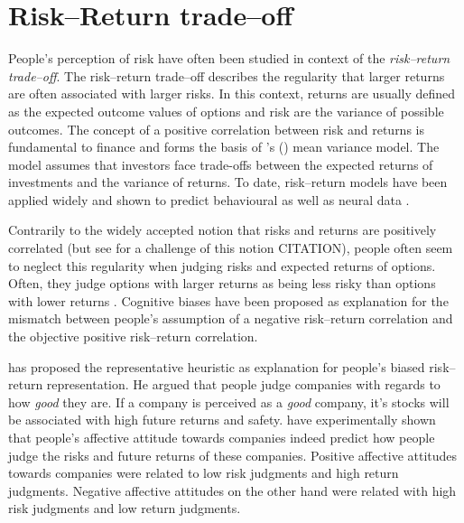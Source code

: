 \documentclass[a4paper,man, natbib,floatsintext]{apa6} %
\begin{document}
\section{Risk--Return trade--off}
People's perception of risk have often been studied in context of the 
\textit{risk--return trade--off}. The risk--return trade--off describes the regularity that larger returns are often associated with larger risks. In this context, returns are usually defined as the expected outcome values of options and risk are the variance of possible outcomes. The concept of a positive correlation between risk and returns is fundamental to finance and forms the basis of \citeauthor{Markowitz1952}'s (\citeyear{Markowitz1952}) mean variance model. The model assumes that investors face trade-offs between the expected returns of investments and the variance of returns. To date, risk--return models have been applied widely \citep[e.g.,][]{Weber2008, Mohr2010a} and shown to predict behavioural as well as neural data \citep{Mohr2010a}. %

Contrarily to the widely accepted notion that risks and returns are positively correlated (but see for a challenge of this notion CITATION), people often seem to neglect this regularity when judging risks and expected returns of options. Often, they judge options with larger returns as being less risky than options with lower returns \citep[e.g.,][]{Kempf2014}. Cognitive biases have been proposed as explanation for the mismatch between people's assumption of a negative risk--return correlation and the objective positive risk--return correlation. 

\cite{Shefrin2001} has proposed the representative heuristic as explanation for people's biased risk--return representation. He argued that people judge companies with regards to how \textit{good} they are. If a company is perceived as a \textit{good} company, it's stocks will be associated with high future returns and safety. \cite{Kempf2014} have experimentally shown that people's affective attitude towards companies indeed predict how people judge the risks and future returns of these companies. Positive affective attitudes towards companies were related to low risk judgments and high return judgments. Negative affective attitudes on the other hand were related with high risk judgments and low return judgments.
\end{document}
